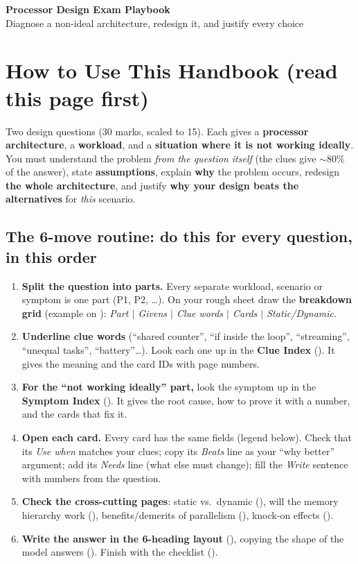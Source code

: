 \begin{center}
{\LARGE\bfseries Processor Design Exam Playbook}\\[1pt]
{\normalsize Diagnose a non-ideal architecture, redesign it, and justify every choice}
\end{center}
\vspace{-2pt}
\section{How to Use This Handbook (read this page first)}\label{sec:howto}

\begin{prof}
Two design questions (30 marks, scaled to 15). Each gives a \textbf{processor architecture}, a \textbf{workload}, and a \textbf{situation where it is not working ideally}. You must understand the problem \emph{from the question itself} (the clues give $\sim$80\% of the answer), state \textbf{assumptions}, explain \textbf{why} the problem occurs, redesign \textbf{the whole architecture}, and justify \textbf{why your design beats the alternatives} for \emph{this} scenario.
\end{prof}

\subsection*{The 6-move routine: do this for every question, in this order}
\begin{enumerate}[label=\textbf{\arabic*.}]
\item \textbf{Split the question into parts.} Every separate workload, scenario or symptom is one part (P1, P2, \ldots). On your rough sheet draw the \textbf{breakdown grid} (example on ): \emph{Part $|$ Givens $|$ Clue words $|$ Cards $|$ Static/Dynamic}.
\item \textbf{Underline clue words} (``shared counter'', ``if inside the loop'', ``streaming'', ``unequal tasks'', ``battery''\ldots). Look each one up in the \textbf{Clue Index} (). It gives the meaning and the card IDs with page numbers.
\item \textbf{For the ``not working ideally'' part,} look the symptom up in the \textbf{Symptom Index} (). It gives the root cause, how to prove it with a number, and the cards that fix it.
\item \textbf{Open each card.} Every card has the same fields (legend below). Check that its \emph{Use when} matches your clues; copy its \emph{Beats} line as your ``why better'' argument; add its \emph{Needs} line (what else must change); fill the \emph{Write} sentence with numbers from the question.
\item \textbf{Check the cross-cutting pages}: static vs.\ dynamic (), will the memory hierarchy work (), benefits/demerits of parallelism (), knock-on effects ().
\item \textbf{Write the answer in the 6-heading layout} (), copying the shape of the model answers (). Finish with the checklist ().
\end{enumerate}

